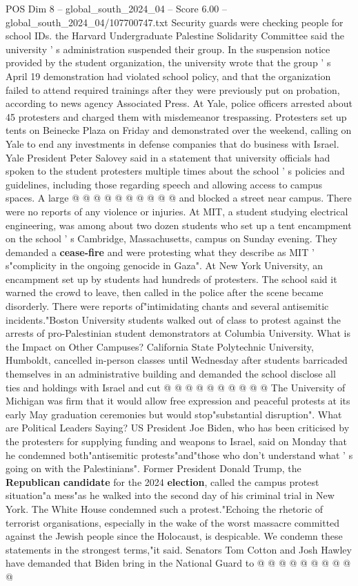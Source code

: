 \begin{textsample}{POS Dim 8 – global\_south\_2024\_04 – Score 6.00 – global\_south\_2024\_04/107700747.txt}
Security guards were checking people for school IDs. the Harvard Undergraduate Palestine Solidarity Committee said the university ' s administration suspended their group.
In the suspension notice provided by the student organization, the university wrote that the group ' s April 19 demonstration had violated school policy, and that the organization failed to attend required trainings after they were previously put on probation, according to news agency Associated Press.
At Yale, police officers arrested about 45 protesters and charged them with misdemeanor trespassing.
Protesters set up tents on Beinecke Plaza on Friday and demonstrated over the weekend, calling on Yale to end any investments in defense companies that do business with Israel.
Yale President Peter Salovey said in a statement that university officials had spoken to the student protesters multiple times about the school ' s policies and guidelines, including those regarding speech and allowing access to campus spaces.
A large @ @ @ @ @ @ @ @ @ @ and blocked a street near campus.
There were no reports of any violence or injuries.
At MIT, a student studying electrical engineering, was among about two dozen students who set up a tent encampment on the school ' s Cambridge, Massachusetts, campus on Sunday evening.
They demanded a \textbf{cease-fire} and were protesting what they describe as MIT ' s"complicity in the ongoing genocide in Gaza".
At New York University, an encampment set up by students had hundreds of protesters.
The school said it warned the crowd to leave, then called in the police after the scene became disorderly.
There were reports of"intimidating chants and several antisemitic incidents."Boston University students walked out of class to protest against the arrests of pro-Palestinian student demonstrators at Columbia University.
What is the Impact on Other Campuses?
California State Polytechnic University, Humboldt, cancelled in-person classes until Wednesday after students barricaded themselves in an administrative building and demanded the school disclose all ties and holdings with Israel and cut @ @ @ @ @ @ @ @ @ @ The University of Michigan was firm that it would allow free expression and peaceful protests at its early May graduation ceremonies but would stop"substantial disruption".
What are Political Leaders Saying?
US President Joe Biden, who has been criticised by the protesters for supplying funding and weapons to Israel, said on Monday that he condemned both"antisemitic protests"and"those who don't understand what ' s going on with the Palestinians".
Former President Donald Trump, the \textbf{Republican} \textbf{candidate} for the 2024 \textbf{election}, called the campus protest situation"a mess"as he walked into the second day of his criminal trial in New York.
The White House condemned such a protest."Echoing the rhetoric of terrorist organisations, especially in the wake of the worst massacre committed against the Jewish people since the Holocaust, is despicable.
We condemn these statements in the strongest terms,"it said.
Senators Tom Cotton and Josh Hawley have demanded that Biden bring in the National Guard to @ @ @ @ @ @ @ @ @ @


\end{textsample}
